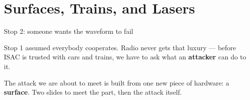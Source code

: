 
\section[In the Field]{Surfaces, Trains, and Lasers}


\begin{frame}{Stop 2: someone wants the waveform to fail}
  \vspace{0.4em}
  \centering

  \vspace{0.9em}
  {\small\raggedright Stop 1 assumed everybody cooperates. Radio never gets that
   luxury --- before ISAC is trusted with cars and trains, we have to ask what an
   \textbf{attacker} can do to it.\par}

  \vspace{0.4em}
  {\small\raggedright The attack we are about to meet is built from one new piece
   of hardware: a \textbf{surface}. Two slides to meet the part, then the attack
   itself.\par}
\end{frame}


